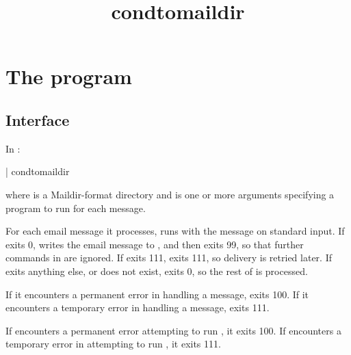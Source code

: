 \documentclass{book}
\title{condtomaildir}
\begin{document}
\section{The  program}

\subsection{Interface}
In :
\begin{code}%
  | condtomaildir  
\end{code}
where  is a Maildir-format directory and  is one
or more arguments specifying a program to run for each message.

For each email message it processes,  runs
 with the message on standard input.  If  exits
0,  writes the email message to , and
then exits 99, so that further commands in  are ignored.
If  exits 111,  exits 111, so delivery
is retried later. If  exits anything else, or does not
exist,  exits 0, so the rest of  is
processed.

If it encounters a permanent error in handling a message,
 exits 100.  If it encounters a temporary
error in handling a message,  exits 111.


If  encounters a permanent error attempting to run
, it exits 100.  If  encounters a
temporary error in attempting to run , it exits 111.
\end{document}

